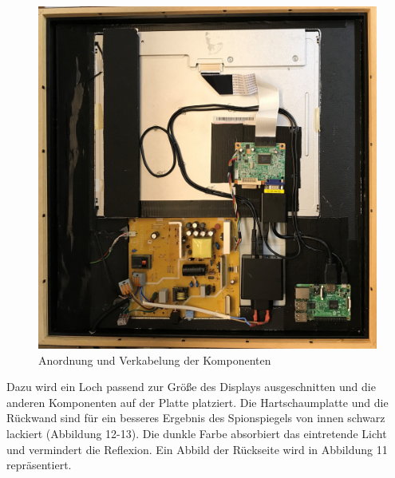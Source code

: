 \begin{figure}
	\includegraphics[scale=0.06]{bilder/Innenansicht.jpg}
	\caption{Anordnung und Verkabelung der Komponenten}
\end{figure}
Dazu wird ein Loch passend zur Größe des Displays ausgeschnitten und die anderen Komponenten auf der Platte platziert. Die Hartschaumplatte und die Rückwand sind für ein besseres Ergebnis des Spionspiegels von innen schwarz lackiert (Abbildung 12-13). 
Die dunkle Farbe absorbiert das eintretende Licht und vermindert die Reflexion. Ein Abbild der Rückseite wird in Abbildung 11 repräsentiert.

